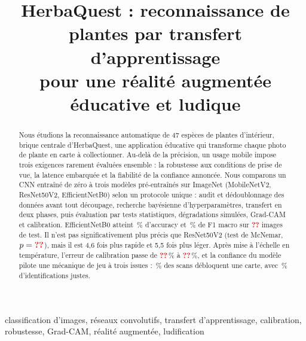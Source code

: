 \documentclass[conference]{IEEEtran}
\newcommand{\todo}{\textcolor{red}{\textbf{??}}}
\newcommand{\nClasses}{47}\newcommand{\imbalance}{\todo}\newcommand{\nDup}{\todo}
\newcommand{\nTest}{\todo}\newcommand{\knnBaseline}{\todo}\newcommand{\bestModel}{\todo}
\newcommand{\eceBefore}{\todo}\newcommand{\eceAfter}{\todo}\newcommand{\thrHigh}{\todo}
\begin{document}
\title{HerbaQuest : reconnaissance de plantes par transfert d'apprentissage\\pour une réalité augmentée éducative et ludique}

\author{
}

\maketitle

\begin{abstract}
Nous étudions la reconnaissance automatique de \nClasses{} espèces de plantes d'intérieur, brique centrale d'HerbaQuest, une application éducative qui transforme chaque photo de plante en carte à collectionner. Au-delà de la précision, un usage mobile impose trois exigences rarement évaluées ensemble : la robustesse aux conditions de prise de vue, la latence embarquée et la fiabilité de la confiance annoncée. Nous comparons un CNN entraîné de zéro à trois modèles pré-entraînés sur ImageNet (MobileNetV2, ResNet50V2, EfficientNetB0) selon un protocole unique : audit et dédoublonnage des données avant tout découpage, recherche bayésienne d'hyperparamètres, transfert en deux phases, puis évaluation par tests statistiques, dégradations simulées, Grad-CAM et calibration. EfficientNetB0 atteint \bestAcc\,\% d'accuracy et \bestF\,\% de F1 macro sur \nTest{} images de test. Il n'est pas significativement plus précis que ResNet50V2 (test de McNemar, $p = \mcnemarP$), mais il est 4,6 fois plus rapide et 5,5 fois plus léger. Après mise à l'échelle en température, l'erreur de calibration passe de \eceBefore\,\% à \eceAfter\,\%, et la confiance du modèle pilote une mécanique de jeu à trois issues : \shareCard\,\% des scans débloquent une carte, avec \accCard\,\% d'identifications justes.
\end{abstract}

\begin{IEEEkeywords}
classification d'images, réseaux convolutifs, transfert d'apprentissage, calibration, robustesse, Grad-CAM, réalité augmentée, ludification
\end{IEEEkeywords}

\end{document}
